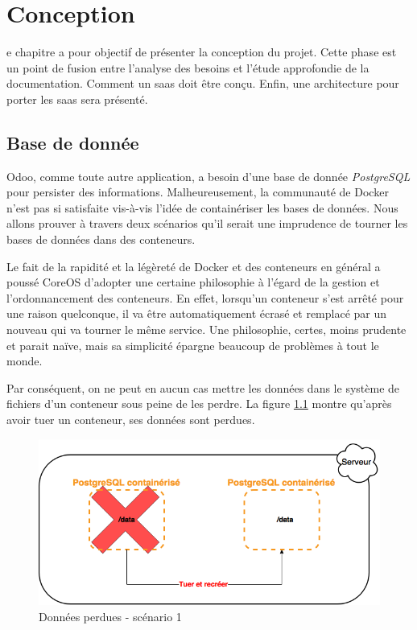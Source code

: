 \chapter{Conception}
\begin{onehalfspace}

e chapitre a pour objectif de présenter la conception du projet. Cette phase est un point de fusion entre l'analyse des besoins et l'étude approfondie de la documentation. Comment un \acrshort{saas} doit être conçu. Enfin, une architecture pour porter les \acrshort{saas} sera présenté.

\newpage

\section{Base de donnée}



Odoo, comme toute autre application, a besoin d'une base de donnée \emph{PostgreSQL} pour persister des informations. Malheureusement, la communauté de Docker n'est pas si satisfaite vis-à-vis l'idée de containériser les bases de données. Nous allons prouver à travers deux scénarios qu'il serait une imprudence de tourner les bases de données dans des conteneurs.

Le fait de la rapidité et la légèreté de Docker et des conteneurs en général a poussé CoreOS d'adopter une certaine philosophie à l'égard de la gestion et l'ordonnancement des conteneurs. En effet, lorsqu'un conteneur s'est arrêté pour une raison quelconque, il va être automatiquement écrasé et remplacé par un nouveau qui va tourner le même service. Une philosophie, certes, moins prudente et parait naïve, mais sa simplicité épargne beaucoup de problèmes à tout le monde.

Par conséquent, on ne peut en aucun cas mettre les données dans le système de fichiers d'un conteneur sous peine de les perdre. La figure \ref{fig:database1} montre qu'après avoir tuer un conteneur, ses données sont perdues.

\begin{figure}[H]
\centering
\includegraphics [scale=0.5]{chapitre4/assets/database1}
\caption{Données perdues - scénario 1}
\label{fig:database1}
\end{figure}


\end{onehalfspace}
